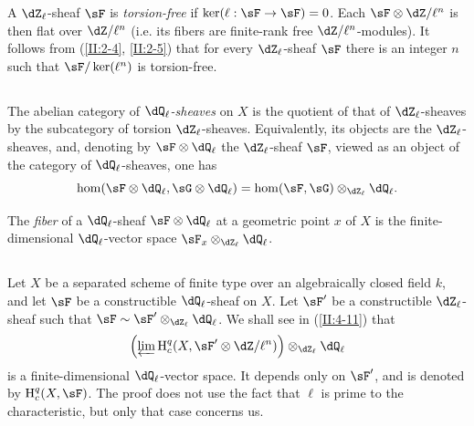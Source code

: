 A $\dZ_\ell$-sheaf $\sF$ is \emph{torsion-free} if
$\ker(\ell:\sF\to\sF) = 0$. Each $\sF\otimes\dZ/\ell^n$ is then flat over
$\dZ/\ell^n$ (i.e. its fibers are finite-rank free
$\dZ/\ell^n$-modules). It follows from (\ref{II:2-4}, \ref{II:2-5}) that for
every $\dZ_\ell$-sheaf $\sF$ there is an integer $n$ such that
$\sF/\ker(\ell^n)$ is torsion-free.






\subsection{}\label{II:2-9}

The abelian category of \emph{$\dQ_\ell$-sheaves} on $X$ is the quotient of
that of $\dZ_\ell$-sheaves by the subcategory of torsion
$\dZ_\ell$-sheaves. Equivalently, its objects are the $\dZ_\ell$-sheaves,
and, denoting by $\sF\otimes\dQ_\ell$ the $\dZ_\ell$-sheaf $\sF$, viewed as
an object of the category of $\dQ_\ell$-sheaves, one has
\[
  \hom(\sF\otimes\dQ_\ell,\sG\otimes\dQ_\ell) = \hom(\sF,\sG)\otimes_{\dZ_\ell}\dQ_\ell \text{.}
\]

The \emph{fiber} of a $\dQ_\ell$-sheaf $\sF\otimes\dQ_\ell$ at a geometric
point $x$ of $X$ is the finite-dimensional $\dQ_\ell$-vector space
$\sF_x\otimes_{\dZ_\ell}\dQ_\ell$.






\subsection{}\label{II:2-10}

Let $X$ be a separated scheme of finite type over an algebraically closed
field $k$, and let $\sF$ be a constructible $\dQ_\ell$-sheaf on $X$. Let
$\sF'$ be a constructible $\dZ_\ell$-sheaf such that
$\sF\sim \sF'\otimes_{\dZ_\ell}\dQ_\ell$. We shall see in
(\ref{II:4-11}) that
\[
  \left(\varprojlim \h_c^q(X,\sF'\otimes \dZ/\ell^n)\right)\otimes_{\dZ_\ell}\dQ_\ell
\]
is a finite-dimensional $\dQ_\ell$-vector space. It depends only on $\sF'$,
and is denoted by $\h_c^q(X,\sF)$. The proof does not use the fact that
$\ell$ is prime to the characteristic, but only that case concerns us.






\subsection{}\label{II:2-11}

